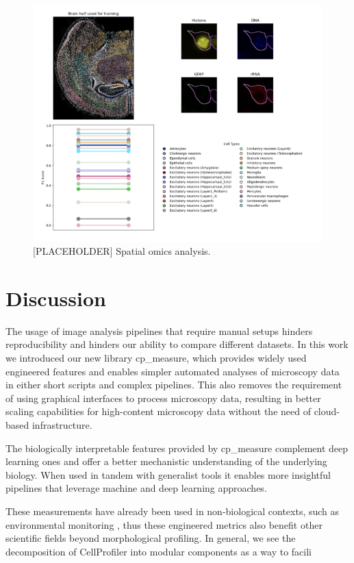 \documentclass{article}
\begin{document}
\begin{figure}[htbp]
\centering
\includegraphics[width=.9\linewidth]{./figs/spatial.png}
\caption{\label{fig:org722dcf5}{[}PLACEHOLDER] Spatial omics analysis.}
\end{figure}
\section{Discussion}
\label{sec:orgf37b369}
The usage of image analysis pipelines that require manual setups hinders reproducibility and hinders our ability to compare different datasets. In this work we introduced our new library cp\_measure, which provides widely used engineered features and enables simpler automated analyses of microscopy data in either short scripts and complex pipelines. This also removes the requirement of using graphical interfaces to process microscopy data, resulting in better scaling capabilities for high-content microscopy data without the need of cloud-based infrastructure.

The biologically interpretable features provided by cp\_measure complement deep learning ones and offer a better mechanistic understanding of the underlying biology. When used in tandem with generalist tools it enables more insightful pipelines that leverage machine and deep learning approaches. 

These measurements have already been used in non-biological contexts, such as environmental monitoring \citep{ideharaExploringNileRed2025}, thus these engineered metrics also benefit other scientific fields beyond morphological profiling. In general, we see the decomposition of CellProfiler into modular components as a way to facili
\end{document}
